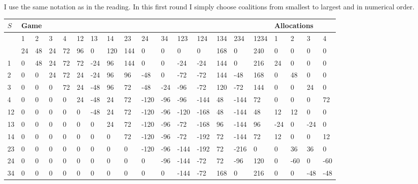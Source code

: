 \documentclass[12pt]{article}
\begin{document}
I use the same notation as in the reading. In this first round I simply choose
coalitions from smallest to largest and in numerical order.
\begin{table}[h]
\centering
\scriptsize
\begin{tabular}{|l|l|l|l|l|l|l|l|l|l|l|l|l|l|l|l|l|l|l|l|}
\hline
$S$ & \multicolumn{15}{l|}{Game}                                                              & \multicolumn{4}{l|}{Allocations} \\ \hline
         & 1  & 2  & 3  & 4  & 12 & 13  & 14  & 23  & 24   & 34  & 123  & 124  & 134 & 234  & 1234 & 1      & 2      & 3      & 4     \\ \hline
         & 24 & 48 & 24 & 72 & 96 & 0   & 120 & 144 & 0    & 0   & 0    & 0    & 168 & 0    & 240  & 0      & 0      & 0      & 0     \\ \hline
1        & 0  & 48 & 24 & 72 & 72 & -24 & 96  & 144 & 0    & 0   & -24  & -24  & 144 & 0    & 216  & 24     & 0      & 0      & 0     \\ \hline
2        & 0  & 0  & 24 & 72 & 24 & -24 & 96  & 96  & -48  & 0   & -72  & -72  & 144 & -48  & 168  & 0      & 48     & 0      & 0     \\ \hline
3        & 0  & 0  & 0  & 72 & 24 & -48 & 96  & 72  & -48  & -24 & -96  & -72  & 120 & -72  & 144  & 0      & 0      & 24     & 0     \\ \hline
4        & 0  & 0  & 0  & 0  & 24 & -48 & 24  & 72  & -120 & -96 & -96  & -144 & 48  & -144 & 72   & 0      & 0      & 0      & 72    \\ \hline
12       & 0  & 0  & 0  & 0  & 0  & -48 & 24  & 72  & -120 & -96 & -120 & -168 & 48  & -144 & 48   & 12     & 12     & 0      & 0     \\ \hline
13       & 0  & 0  & 0  & 0  & 0  & 0   & 24  & 72  & -120 & -96 & -72  & -168 & 96  & -144 & 96   & -24    & 0      & -24    & 0     \\ \hline
14       & 0  & 0  & 0  & 0  & 0  & 0   & 0   & 72  & -120 & -96 & -72  & -192 & 72  & -144 & 72   & 12     & 0      & 0      & 12    \\ \hline
  23
    & 0  & 0  & 0  & 0  & 0  & 0   & 0   & 0   & -120 & -96 & -144 & -192 & 72  & -216 & 0    & 0      & 36     & 36     & 0     \\ \hline
24       & 0  & 0  & 0  & 0  & 0  & 0   & 0   & 0   & 0    & -96 & -144 & -72  & 72  & -96  & 120  & 0      & -60    & 0      & -60   \\ \hline
34       & 0  & 0  & 0  & 0  & 0  & 0   & 0   & 0   & 0    & 0   & -144 & -72  & 168 & 0    & 216  & 0      & 0      & -48    & -48   \\ \hline

\end{tabular}
\end{table}
\end{document}
